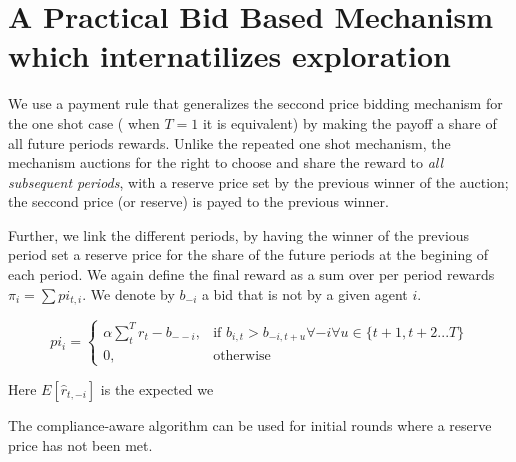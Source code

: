 

\section{A Practical Bid Based Mechanism which internatilizes exploration}


We use a payment rule that generalizes the seccond price bidding mechanism for the one shot case ( when $T=1$ it is equivalent) by making the payoff a share of all future periods rewards.  Unlike the repeated one shot mechanism, the mechanism auctions for the right to choose and  share the reward to \emph{all subsequent periods}, with a reserve price set by the previous winner of the auction; the seccond price (or reserve) is payed to the previous winner.  

Further, we link the different periods, by having the winner of the previous period set a reserve price for the share of the future periods at the begining of each period. We again define the final reward as a sum over per period rewards $\pi_i = \sum pi_{t,i}$. We denote by $b_{-i}$ a bid that is not by a given agent $i$. 

\[
pi_{i} =
\begin{cases}
    \alpha \sum_t^T r_t - b_{--i}, & \text{if } b_{i,t} > b_{-i,t+u} \forall -i \forall u \in \{t+1,t+2...T\}\\
    0,              & \text{otherwise}
\end{cases}
\]


Here $E[\hat{r}_{t,-i}]$ is the expected we


The compliance-aware algorithm can be used for initial rounds where a reserve price has not been met.



